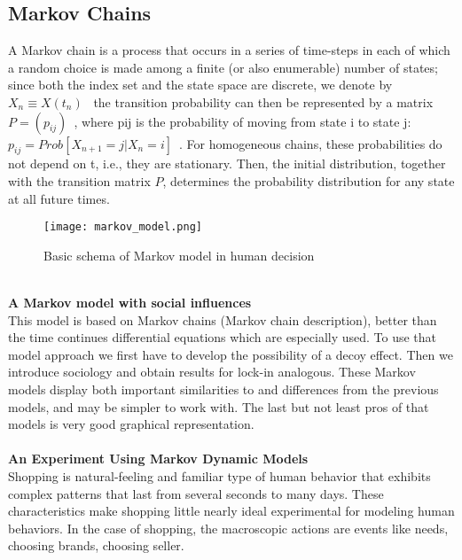 \subsection{Markov Chains} \label{subsec:chain}
A Markov chain is a process that occurs in a series of time-steps in each of which a random choice is made
among a finite (or also enumerable) number of states; since both the index set and the state space are discrete,
we denote by\\
$X_n \equiv X(t_n)$~\cite{patel} the transition probability can then be represented by a matrix\\
$P=(p_{ij})$~\cite{patel}, where pij is the probability of moving from state i to state j:\\
$p_{ij}=Prob[X_{n+1}=j|X_n=i]$~\cite{patel}. For homogeneous chains, these
probabilities do not depend on t, i.e., they are stationary. Then, the initial distribution, together with the
transition matrix $P$, determines the probability distribution for any state at all future times.\\
\begin{figure}[h!]
	\begin{center}
		\texttt{[image: markov\_model.png]}
	\end{center}
	\caption{Basic schema of Markov model in human decision}
	\label{Markov model}
\end{figure}
\\
\textbf{A Markov model with social influences} \label{subsec:markov}\\
This model is based on Markov chains (Markov chain description), better than the time continues differential
equations which are especially used.
To use that model approach we first have to develop the possibility of a decoy effect.
Then we introduce sociology and obtain results for lock-in analogous.
These Markov models display both important similarities to and differences from the previous models, and may be simpler to work with.
The last but not least pros of that models is very good graphical representation.\\
\\
\textbf{An Experiment Using Markov Dynamic Models} \label{subsec:markov_dynamic}\\
Shopping is natural-feeling and familiar type of human behavior that exhibits complex patterns that last from several
seconds to many days.
These characteristics make shopping little nearly ideal experimental for modeling human behaviors.
In the case of shopping, the macroscopic actions are events like needs, choosing brands, choosing seller.
